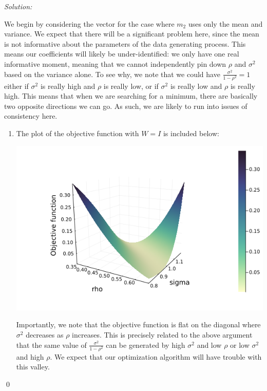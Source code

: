 \documentclass[12pt]{article}
\newenvironment{sol}
    {\emph{Solution:}
    }
    {
    \qed
    }
\begin{document}
\begin{sol}
    We begin by considering the vector for the case where $m_2$ uses only the mean and variance. We expect that there will be a significant problem here, since the mean is not informative about the parameters of the data generating process. This means our coefficients will likely be under-identified: we only have one real informative moment, meaning that we cannot independently pin down $\rho$ and $\sigma^2$ based on the variance alone. To see why, we note that we could have $\frac{\sigma^2}{1-\rho^2} = 1$ either if $\sigma^2$ is really high and $\rho$ is really low, or if $\sigma^2 $ is really low and $\rho$ is really high. This means that when we are searching for a minimum, there are basically two opposite directions we can go. As such, we are likely to run into issues of consistency here.
    \begin{enumerate}[label=\alph*) ]
        \item The plot of the objective function with $W = I$ is included below:
        \begin{center}
            \includegraphics[scale=0.4]{jthplot_1_init.png}
        \end{center}
        Importantly, we note that the objective function is flat on the diagonal where $\sigma^2$ decreases as $\rho$ increases. This is precisely related to the above argument that the same value of $\frac{\sigma^2}{1-\rho^2}$ can be generated by high $\sigma^2$ and low $\rho$ or low $\sigma^2$ and high $\rho$. We expect that our optimization algorithm will have trouble with this valley.


\end{enumerate}
\end{sol}
\end{document}
